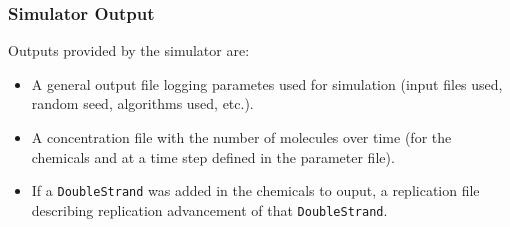 \subsubsection{Simulator Output}

Outputs provided by the simulator are:
\begin{itemize}
\item A general output file logging parametes used for simulation (input files used, random seed, algorithms used, etc.).
\item A concentration file with the number of molecules over time (for the chemicals and at a time step defined in the parameter file).
\item If a \texttt{DoubleStrand} was added in the chemicals to ouput, a replication file describing replication advancement of that \texttt{DoubleStrand}.
\end{itemize}
